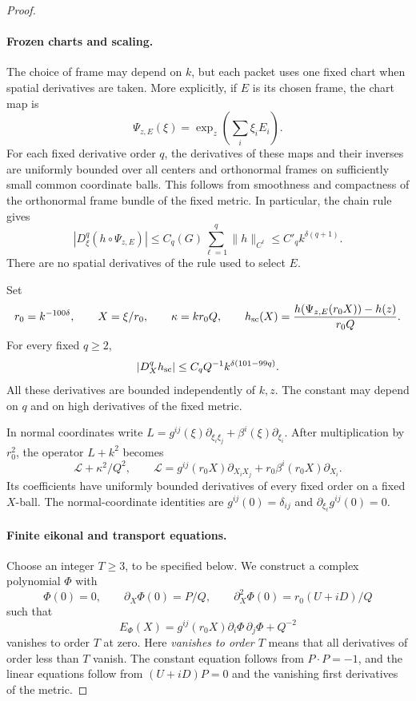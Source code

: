 \begin{proof}
\paragraph{Frozen charts and scaling.}
The choice of frame may depend on \(k\), but each packet uses one
fixed chart when spatial derivatives are taken. More explicitly, if
\(E\) is its chosen frame, the chart map is
\[
 \Psi_{z,E}(\xi)=\exp_z\left(\sum_i\xi_iE_i\right).
\]
For each fixed derivative order \(q\), the derivatives of these maps
and their inverses are uniformly bounded over all centers and
orthonormal frames on sufficiently small common coordinate balls.
This follows from smoothness and compactness of the orthonormal
frame bundle of the fixed metric. In particular, the chain rule
gives
\[
 |D_\xi^q(h\circ\Psi_{z,E})|
 \le C_q(G)\sum_{\ell=1}^q\|h\|_{C^\ell}
 \le C'_q k^{\delta(q+1)}.
\]
There are no spatial derivatives of the rule used to select \(E\).

Set
\begin{equation}\label{eq:waves-scaling}
 r_0=k^{-100\delta},\qquad X=\xi/r_0,\qquad
 \kappa=kr_0Q,\qquad
 h_{\rm sc}(X)=\frac{h(\Psi_{z,E}(r_0X))-h(z)}{r_0Q}.
\end{equation}
For every fixed \(q\ge2\),
\begin{equation}\label{eq:waves-scaled-envelope}
 |D_X^q h_{\rm sc}|
 \le C_q Q^{-1}k^{\delta(101-99q)}.
\end{equation}
All these derivatives are bounded independently of \(k,z\). The
constant may depend on \(q\) and on high derivatives of the fixed
metric.

In normal coordinates write
\(L=g^{ij}(\xi)\partial_{\xi_i\xi_j}
+\beta^i(\xi)\partial_{\xi_i}\).
After multiplication by \(r_0^2\), the operator \(L+k^2\) becomes
\[
 \mathcal L+\kappa^2/Q^2,\qquad
 \mathcal L=g^{ij}(r_0X)\partial_{X_iX_j}
        +r_0\beta^i(r_0X)\partial_{X_i}.
\]
Its coefficients have uniformly bounded derivatives of every fixed
order on a fixed \(X\)-ball. The normal-coordinate identities are
\(g^{ij}(0)=\delta_{ij}\) and
\(\partial_{\xi_\ell}g^{ij}(0)=0\).

\paragraph{Finite eikonal and transport equations.}
Choose an integer \(T\ge3\), to be specified below. We construct a
complex polynomial \(\Phi\) with
\[
 \Phi(0)=0,\qquad
 \partial_X\Phi(0)=P/Q,\qquad
 \partial_X^2\Phi(0)=r_0(U+iD)/Q
\]
such that
\[
 E_\Phi(X)
 =g^{ij}(r_0X)\partial_i\Phi\,\partial_j\Phi+Q^{-2}
\]
vanishes to order \(T\) at zero. Here \emph{vanishes to order \(T\)}
means that all derivatives of order less than \(T\) vanish.
The constant equation follows from \(P\cdot P=-1\), and the linear
equations follow from \((U+iD)P=0\) and the vanishing first derivatives
of the metric.


\end{proof}
